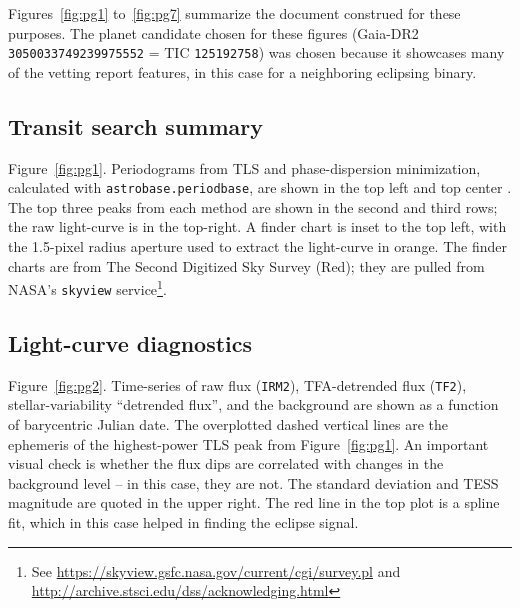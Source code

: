 \documentclass[12pt,twocolumn,tighten]{aastex62}
\begin{document}
Figures~\ref{fig:pg1} to~\ref{fig:pg7} summarize the document
construed for these purposes.  The planet candidate chosen for these
figures (Gaia-DR2 \texttt{3050033749239975552} = TIC
\texttt{125192758}) was chosen because it showcases many of the
vetting report features, in this case for a neighboring eclipsing binary.

\subsection{Transit search summary}
\label{sec:pg1}

Figure~\ref{fig:pg1}.  Periodograms from TLS and phase-dispersion
minimization, calculated with \texttt{astrobase.periodbase}, are shown
in the top left and top center
\citep{bhatti_astrobase_2018,hippke_TLS_2019,stellingwerf_period_1978}.
The top three peaks from each method are shown in the second and third
rows; the raw light-curve is in the top-right. A finder chart
is inset to the top left, with the 1.5-pixel radius aperture
used to extract the light-curve in orange.
The finder charts are from The Second Digitized Sky Survey (Red); they
are pulled from NASA's \texttt{skyview} service\footnote{See
\url{https://skyview.gsfc.nasa.gov/current/cgi/survey.pl} and
\url{http://archive.stsci.edu/dss/acknowledging.html}}.

\subsection{Light-curve diagnostics}
\label{sec:pg2}

Figure~\ref{fig:pg2}.
Time-series of raw flux (\texttt{IRM2}),  TFA-detrended flux
(\texttt{TF2}), stellar-variability ``detrended flux'', and the background
are shown as a function of barycentric Julian date.  The overplotted
dashed vertical lines are the ephemeris of the highest-power TLS peak
from Figure~\ref{fig:pg1}.  An important visual check is whether the flux
dips are correlated with changes in the background level -- in this
case, they are not.  The standard deviation and TESS magnitude are
quoted in the upper right.  The red line in the top
plot is a spline fit, which in this case helped in
finding the eclipse signal.
\end{document}
